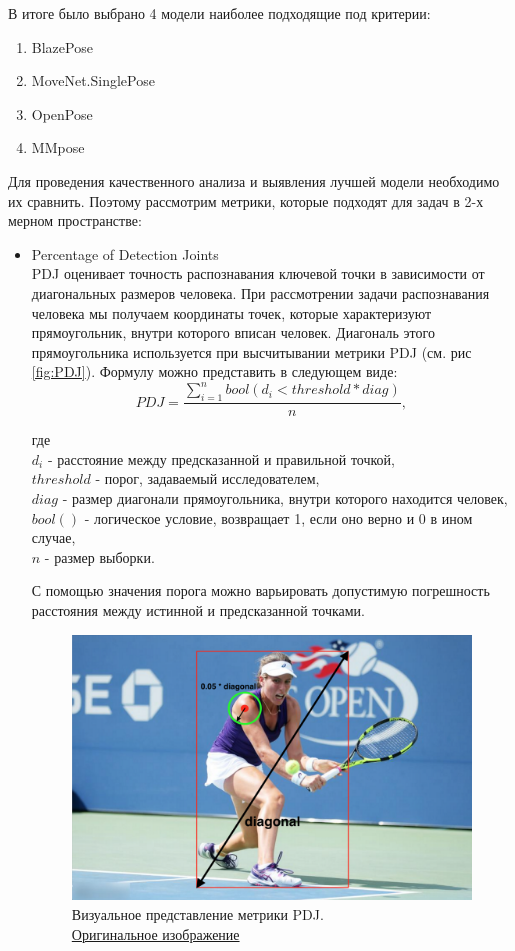 В итоге было выбрано 4 модели наиболее подходящие под критерии:
\begin{enumerate}
	\item BlazePose
	\item MoveNet.SinglePose
	\item OpenPose
	\item MMpose
\end{enumerate}

Для проведения качественного анализа и выявления лучшей модели необходимо их сравнить. Поэтому рассмотрим метрики, которые подходят для задач в 2-х мерном пространстве:

\begin{itemize}
	\item Percentage of Detection Joints\\
	PDJ оценивает точность распознавания ключевой точки в зависимости от диагональных размеров человека. При рассмотрении задачи распознавания человека мы получаем координаты точек, которые характеризуют прямоугольник, внутри которого вписан человек. Диагональ этого прямоугольника используется при высчитывании метрики PDJ (см. рис \autoref{fig:PDJ}). Формулу можно представить в следующем виде:
	\begin{equation}
		PDJ = \frac{\sum_{i=1}^{n} bool(d_i < threshold * diag)}{n},
	\end{equation}
	
	где\\
	$d_i$ - расстояние между предсказанной и правильной точкой,\\
	$threshold$ - порог, задаваемый исследователем,\\
	$diag$ - размер диагонали прямоугольника, внутри которого находится человек,\\
	$bool()$ - логическое условие, возвращает 1, если оно верно и 0 в ином случае,\\
	$n$ - размер выборки.
	
	С помощью значения порога можно варьировать допустимую погрешность расстояния между истинной и предсказанной точками.
	\begin{figure}[h]
		\centering
		\includegraphics[width=\textwidth * 4 / 5]{./images/PDJ}
		\caption{Визуальное представление метрики PDJ.\\ \href{hhttps://miro.medium.com/max/1400/1*dJhVudwq7pb_xl3yPEH37Q.jpeg}{Оригинальное изображение}}
		\label{fig:PDJ}
	\end{figure}


\end{itemize}
